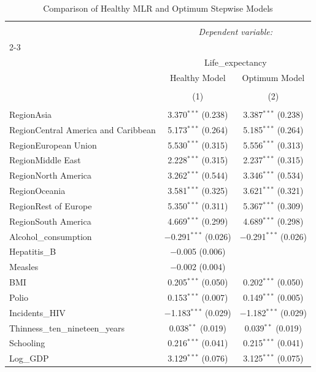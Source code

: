 \documentclass[
  10pt,
]{article}
\begin{document}
\begin{table}[!htbp] \centering 
  \caption{Comparison of Healthy MLR and Optimum Stepwise Models} 
  \label{} 
\begin{tabular}{@{\extracolsep{5pt}}lcc} 
\\[-1.8ex]\hline 
\hline \\[-1.8ex] 
 & \multicolumn{2}{c}{\textit{Dependent variable:}} \\ 
\cline{2-3} 
\\[-1.8ex] & \multicolumn{2}{c}{Life\_expectancy} \\ 
 & Healthy Model & Optimum Model \\ 
\\[-1.8ex] & (1) & (2)\\ 
\hline \\[-1.8ex] 
 RegionAsia & 3.370$^{***}$ (0.238) & 3.387$^{***}$ (0.238) \\ 
  RegionCentral America and Caribbean & 5.173$^{***}$ (0.264) & 5.185$^{***}$ (0.264) \\ 
  RegionEuropean Union & 5.530$^{***}$ (0.315) & 5.556$^{***}$ (0.313) \\ 
  RegionMiddle East & 2.228$^{***}$ (0.315) & 2.237$^{***}$ (0.315) \\ 
  RegionNorth America & 3.262$^{***}$ (0.544) & 3.346$^{***}$ (0.534) \\ 
  RegionOceania & 3.581$^{***}$ (0.325) & 3.621$^{***}$ (0.321) \\ 
  RegionRest of Europe & 5.350$^{***}$ (0.311) & 5.367$^{***}$ (0.309) \\ 
  RegionSouth America & 4.669$^{***}$ (0.299) & 4.689$^{***}$ (0.298) \\ 
  Alcohol\_consumption & $-$0.291$^{***}$ (0.026) & $-$0.291$^{***}$ (0.026) \\ 
  Hepatitis\_B & $-$0.005 (0.006) &  \\ 
  Measles & $-$0.002 (0.004) &  \\ 
  BMI & 0.205$^{***}$ (0.050) & 0.202$^{***}$ (0.050) \\ 
  Polio & 0.153$^{***}$ (0.007) & 0.149$^{***}$ (0.005) \\ 
  Incidents\_HIV & $-$1.183$^{***}$ (0.029) & $-$1.182$^{***}$ (0.029) \\ 
  Thinness\_ten\_nineteen\_years & 0.038$^{**}$ (0.019) & 0.039$^{**}$ (0.019) \\ 
  Schooling & 0.216$^{***}$ (0.041) & 0.215$^{***}$ (0.041) \\ 
  Log\_GDP & 3.129$^{***}$ (0.076) & 3.125$^{***}$ (0.075) \\ 

\end{tabular}
\end{table}
\end{document}
